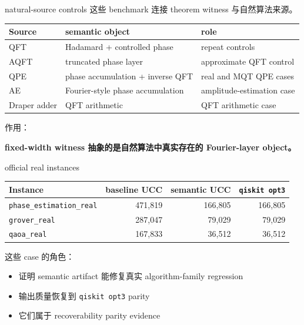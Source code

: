 \documentclass[aspectratio=169,11pt]{ctexbeamer}
\begin{document}
\begin{frame}{natural-source controls}
  这些 benchmark 连接 theorem witness 与自然算法来源。

  \small
  \begin{tabular}{lll}
    \toprule
    Source & semantic object & role \\
    \midrule
    QFT & Hadamard + controlled phase & repeat controls \\
    AQFT & truncated phase layer & approximate QFT control \\
    QPE & phase accumulation + inverse QFT & real and MQT QPE cases \\
    AE & Fourier-style phase accumulation & amplitude-estimation case \\
    Draper adder & QFT arithmetic & QFT arithmetic case \\
    \bottomrule
  \end{tabular}

  \vspace{0.8em}
  作用：
  \begin{center}
    \textbf{fixed-width witness 抽象的是自然算法中真实存在的 Fourier-layer object。}
  \end{center}
\end{frame}

\begin{frame}{official real instances}
  \small
  \begin{tabular}{lrrr}
    \toprule
    Instance & baseline UCC & semantic UCC & \texttt{qiskit opt3} \\
    \midrule
    \texttt{phase\_estimation\_real} & 471{,}819 & 166{,}805 & 166{,}805 \\
    \texttt{grover\_real} & 287{,}047 & 79{,}029 & 79{,}029 \\
    \texttt{qaoa\_real} & 167{,}833 & 36{,}512 & 36{,}512 \\
    \bottomrule
  \end{tabular}

  \vspace{0.8em}
  这些 case 的角色：
  \begin{itemize}
    \item 证明 semantic artifact 能修复真实 algorithm-family regression
    \item 输出质量恢复到 \texttt{qiskit opt3} parity
    \item 它们属于 recoverability parity evidence
  \end{itemize}
\end{frame}
\end{document}
